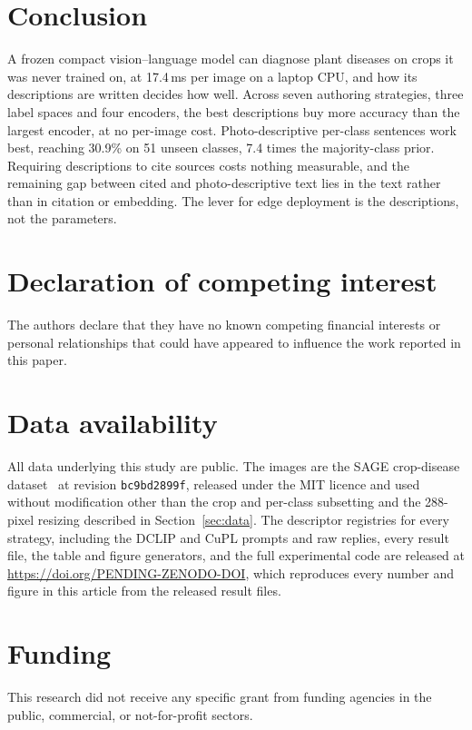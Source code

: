 \documentclass[a4paper,fleqn]{cas-dc}
\begin{document}
\section{Conclusion}
\label{sec:conclusion}

A frozen compact vision--language model can diagnose plant diseases on crops it was never trained on,
at 17.4\,ms per image on a laptop CPU, and how its descriptions are written decides how well. Across
seven authoring strategies, three label spaces and four encoders, the best descriptions buy more
accuracy than the largest encoder, at no per-image cost. Photo-descriptive per-class sentences work
best, reaching 30.9\% on 51 unseen classes, 7.4 times the majority-class prior. Requiring
descriptions to cite sources costs nothing measurable, and the remaining gap between cited and
photo-descriptive text lies in the text rather than in citation or embedding. The lever for edge
deployment is the descriptions, not the parameters.

\printcredits

\section*{Declaration of competing interest}
The authors declare that they have no known competing financial interests or personal relationships
that could have appeared to influence the work reported in this paper.

\section*{Data availability}
All data underlying this study are public. The images are the SAGE crop-disease
dataset~\citep{sagedata2026} at revision \texttt{bc9bd2899f}, released under the MIT licence and
used without modification other than the crop and per-class subsetting and the 288-pixel resizing
described in Section~\ref{sec:data}. The descriptor registries for every strategy, including the
DCLIP and CuPL prompts and raw replies, every result file, the table and figure generators, and the
full experimental code are released at \url{https://doi.org/PENDING-ZENODO-DOI}, which reproduces
every number and figure in this article from the released result files.

\section*{Funding}
This research did not receive any specific grant from funding agencies in the public, commercial, or
not-for-profit sectors.
\end{document}
